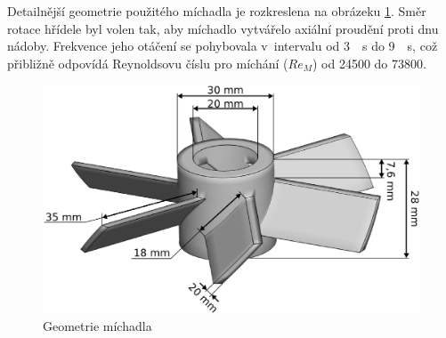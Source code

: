 Detailnější geometrie použitého míchadla je rozkreslena na obrázeku \ref{fig:imp}. Směr rotace hřídele byl volen tak, aby míchadlo vytvářelo axiální proudění proti dnu nádoby. Frekvence jeho otáčení se pohybovala v~intervalu od \SI{3}{\per\second} do \SI{9}{\per\second}, což přibližně odpovídá Reynoldsovu číslu pro míchání ($Re_{M}$) od \num{24500} do \num{73800}.
\begin{figure}[t]
\centering
\includegraphics[scale=0.35]{images/imp.eps}
\caption{Geometrie míchadla}
\label{fig:imp}
\end{figure} 

